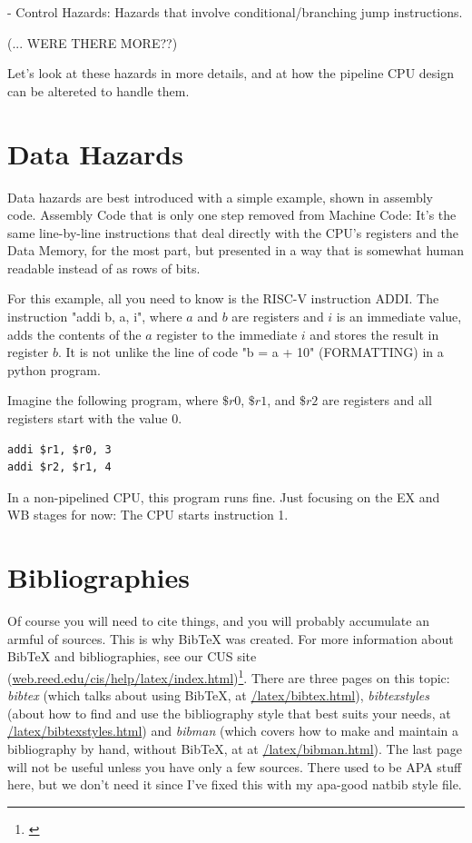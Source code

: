 \documentclass[12pt,twoside]{reedthesis}
\begin{document}
- Control Hazards: Hazards that involve conditional/branching jump instructions.

(... WERE THERE MORE??)

Let's look at these hazards in more details, and at how the pipeline CPU design can be altereted to handle them.

\section{Data Hazards}

Data hazards are best introduced with a simple example, shown in assembly code. Assembly Code that is only one step removed from Machine Code: It's the same line-by-line instructions that deal directly with the CPU's registers and the Data Memory, for the most part, but presented in a way that is somewhat human readable instead of as rows of bits.

For this example, all you need to know is the RISC-V instruction ADDI. The instruction "addi b, a, i", where $a$ and $b$ are registers and $i$ is an immediate value, adds the contents of the $a$ register to the immediate $i$ and stores the result in register $b$. It is not unlike the line of code "b = a + 10" (FORMATTING) in a python program.

Imagine the following program, where $\$r0$, $\$r1$, and $\$r2$ are registers and all registers start with the value 0.

\break
\begin{verbatim}
addi $r1, $r0, 3
addi $r2, $r1, 4
\end{verbatim}

In a non-pipelined CPU, this program runs fine. Just focusing on the EX and WB stages for now: 
The CPU starts instruction 1.

\section{Bibliographies}
Of course you will need to cite things, and you will probably accumulate an armful of sources. This is why BibTeX was created. For more information about BibTeX and bibliographies, see our CUS site (\url{web.reed.edu/cis/help/latex/index.html})\footnote{\cite{reedweb:2007}}. There are three pages on this topic: {\it bibtex} (which talks about using BibTeX, at \url{/latex/bibtex.html}), {\it bibtexstyles} (about how to find and use the bibliography style that best suits your needs, at \url{/latex/bibtexstyles.html}) and {\it bibman} (which covers how to make and maintain a bibliography by hand, without BibTeX, at at \url{/latex/bibman.html}). The last page will not be useful unless you have only a few sources. There used to be APA stuff here, but we don't need it since I've fixed this with my apa-good natbib style file.
\end{document}
